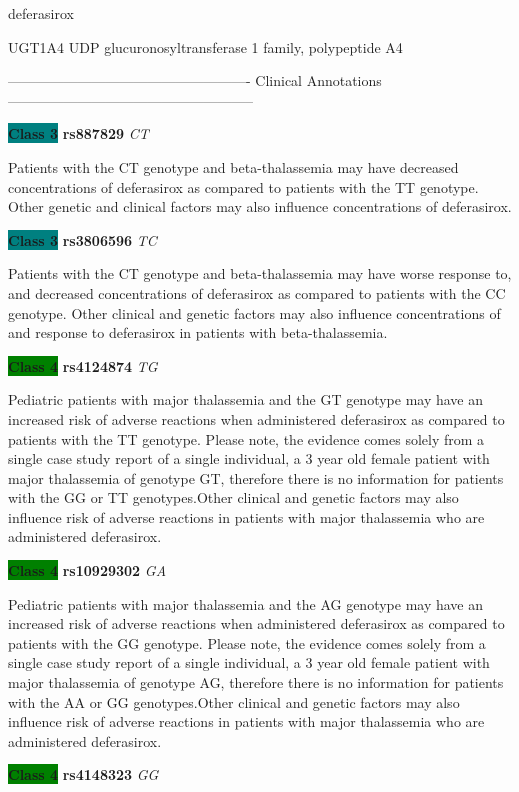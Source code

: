 \documentclass{resume} %
\begin{document}
\begin{rSection}{ deferasirox }
\begin{rSubsection}{ UGT1A4 }{ UDP glucuronosyltransferase 1 family, polypeptide A4 }{}{}
\item[] ---------------------------------------------------- Clinical Annotations -----------------------------------------------------\newline
\item \textbf{\colorbox{teal} {Class 3}} \textbf{ rs887829 } \textit{ CT }
\item[] Patients with the CT genotype and beta-thalassemia may have decreased concentrations of deferasirox as compared to patients with the TT genotype. Other genetic and clinical factors may also influence concentrations of deferasirox.\item \textbf{\colorbox{teal} {Class 3}} \textbf{ rs3806596 } \textit{ TC }
\item[] Patients with the CT genotype and beta-thalassemia may have worse response to, and decreased concentrations of deferasirox as compared to patients with the CC genotype. Other clinical and genetic factors may also influence concentrations of and response to deferasirox in patients with beta-thalassemia.\item \textbf{\colorbox{green} {Class 4}} \textbf{ rs4124874 } \textit{ TG }
\item[] Pediatric patients with major thalassemia and the GT genotype may have an increased risk of adverse reactions when administered deferasirox as compared to patients with the TT genotype. Please note, the evidence comes solely from a single case study report of a single individual, a 3 year old female patient with major thalassemia of genotype GT, therefore there is no information for patients with the GG or TT genotypes.Other clinical and genetic factors may also influence risk of adverse reactions in patients with major thalassemia who are administered deferasirox. \item \textbf{\colorbox{green} {Class 4}} \textbf{ rs10929302 } \textit{ GA }
\item[] Pediatric patients with major thalassemia and the AG genotype may have an increased risk of adverse reactions when administered deferasirox as compared to patients with the GG genotype. Please note, the evidence comes solely from a single case study report of a single individual, a 3 year old female patient with major thalassemia of genotype AG, therefore there is no information for patients with the AA or GG genotypes.Other clinical and genetic factors may also influence risk of adverse reactions in patients with major thalassemia who are administered deferasirox.\item \textbf{\colorbox{green} {Class 4}} \textbf{ rs4148323 } \textit{ GG }

\end{rSubsection}
\end{rSection}
\end{document}
